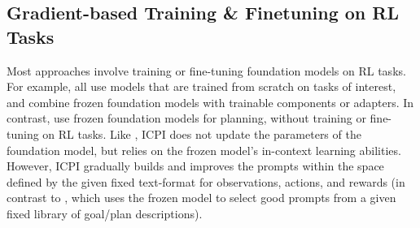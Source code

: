 \documentclass{article}
\begin{document}
\subsection{Gradient-based Training \& Finetuning on RL Tasks}
Most approaches involve training or fine-tuning foundation models on RL tasks.
For example,
\cite{janner_offline_2021,chen_decision_2021,lee_multi-game_2022,xu_prompting_2022,baker_video_2022,reed_generalist_2022}
all use models that are trained from scratch on tasks of interest, and
\cite{singh_know_2022,ahn_as_2022,huang_inner_2022} combine frozen foundation
models with trainable components or adapters. In contrast,
\cite{huang_language_2022} use frozen foundation models for planning, without
training or fine-tuning on RL tasks. Like \cite{huang_language_2022}, ICPI does
not update the parameters of the foundation model, but relies on the frozen model's
in-context learning abilities. However, ICPI gradually builds and improves the
prompts within the space defined by the given fixed text-format for
observations, actions, and rewards (in contrast to \cite{huang_language_2022},
which uses the frozen model to select good prompts from a given fixed library of
goal/plan descriptions).
\end{document}
